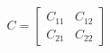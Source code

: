 \documentclass[preview]{standalone}
\begin{document}
\begin{align*}
C = \begin{bmatrix} C_{11} & C_{12} \\ C_{21} & C_{22} \end{bmatrix}
\end{align*}
\end{document}
